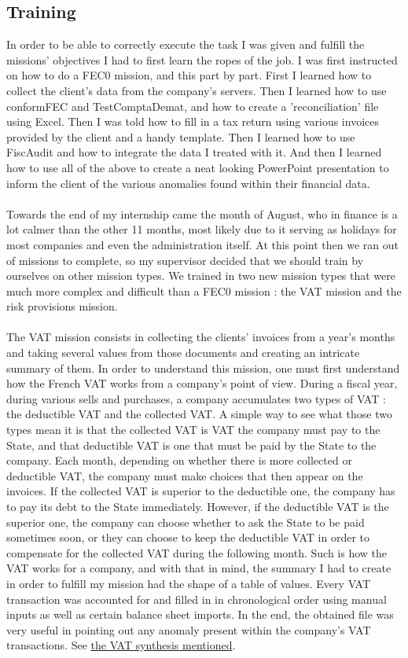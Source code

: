 \documentclass[12pt]{article}
\begin{document}
\subsection{Training}

In order to be able to correctly execute the task I was given and fulfill the missions' objectives I had to first learn the ropes of the job. I was first instructed on how to do a FEC0 mission, and this part by part. First I learned how to collect the client's data from the company's servers. Then I learned how to use conformFEC and TestComptaDemat, and how to create a 'reconciliation' file using Excel. Then I was told how to fill in a tax return using various invoices provided by the client and a handy template. Then I learned how to use FiscAudit and how to integrate the data I treated with it. And then I learned how to use all of the above to create a neat looking PowerPoint presentation to inform the client of the various anomalies found within their financial data. \\ \\
Towards the end of my internship came the month of August, who in finance is a lot calmer than the other 11 months, most likely due to it serving as holidays for most companies and even the administration itself. At this point then we ran out of missions to complete, so my supervisor decided that we should train by ourselves on other mission types. We trained in two new mission types that were much more complex and difficult than a FEC0 mission : the VAT mission and the risk provisions mission. \\ \\
The VAT mission consists in collecting the clients' invoices from a year's months and taking several values from those documents and creating an intricate summary of them. In order to understand this mission, one must first understand how the French VAT works from a company's point of view. During a fiscal year, during various sells and purchases, a company accumulates two types of VAT : the deductible VAT and the collected VAT. A simple way to see what those two types mean it is that the collected VAT is VAT the company must pay to the State, and that deductible VAT is one that must be paid by the State to the company. Each month, depending on whether there is more collected or deductible VAT, the company must make choices that then appear on the invoices. If the collected VAT is superior to the deductible one, the company has to pay its debt to the State immediately. However, if the deductible VAT is the superior one, the company can choose whether to ask the State to be paid sometimes soon, or they can choose to keep the deductible VAT in order to compensate for the collected VAT during the following month. Such is how the VAT works for a company, and with that in mind, the summary I had to create in order to fulfill my mission had the shape of a table of values. Every VAT transaction was accounted for and filled in in chronological order using manual inputs as well as certain balance sheet imports. In the end, the obtained file was very useful in pointing out any anomaly present within the company's VAT transactions. See \hyperref[VAT]{the VAT synthesis mentioned}. \\ \\
\end{document}
